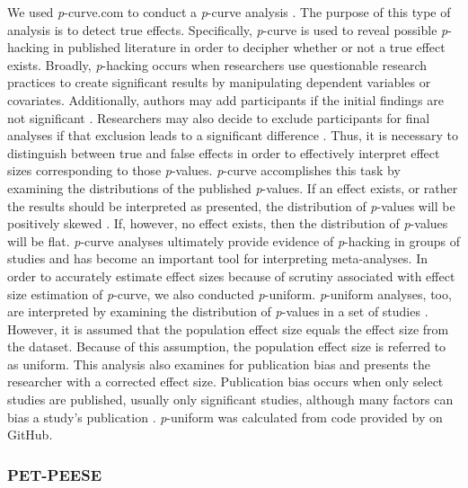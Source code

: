 \documentclass[english,man]{apa6}
\newcounter{author}
\theoremstyle{definition}
\theoremstyle{definition}
\theoremstyle{definition}
\theoremstyle{remark}
\begin{document}
We used \emph{p}-curve.com to conduct a \emph{p}-curve analysis
\autocite{Simonsohn2014}. The purpose of this type of analysis is to
detect true effects. Specifically, \emph{p}-curve is used to reveal
possible \emph{p}-hacking in published literature in order to decipher
whether or not a true effect exists. Broadly, \emph{p}-hacking occurs
when researchers use questionable research practices to create
significant results by manipulating dependent variables or covariates.
Additionally, authors may add participants if the initial findings are
not significant \autocite{Bruns2016}. Researchers may also decide to
exclude participants for final analyses if that exclusion leads to a
significant difference \autocite{John2012}. Thus, it is necessary to
distinguish between true and false effects in order to effectively
interpret effect sizes corresponding to those \emph{p}-values.
\emph{p}-curve accomplishes this task by examining the distributions of
the published \emph{p}-values. If an effect exists, or rather the
results should be interpreted as presented, the distribution of
\emph{p}-values will be positively skewed \autocite{Simonsohn2014}. If,
however, no effect exists, then the distribution of \emph{p}-values will
be flat. \emph{p}-curve analyses ultimately provide evidence of
\emph{p}-hacking in groups of studies and has become an important tool
for interpreting meta-analyses. In order to accurately estimate effect
sizes because of scrutiny associated with effect size estimation of
\emph{p}-curve, we also conducted \emph{p}-uniform. \emph{p}-uniform
analyses, too, are interpreted by examining the distribution of
\emph{p}-values in a set of studies \autocite{VanAert2016}. However, it
is assumed that the population effect size equals the effect size from
the dataset. Because of this assumption, the population effect size is
referred to as uniform. This analysis also examines for publication bias
and presents the researcher with a corrected effect size. Publication
bias occurs when only select studies are published, usually only
significant studies, although many factors can bias a study's
publication \autocite{McShane2016}. \emph{p}-uniform was calculated from
code provided by \textcite{VanAert2017} on GitHub.

\subsubsection{PET-PEESE}\label{pet-peese}
\end{document}
